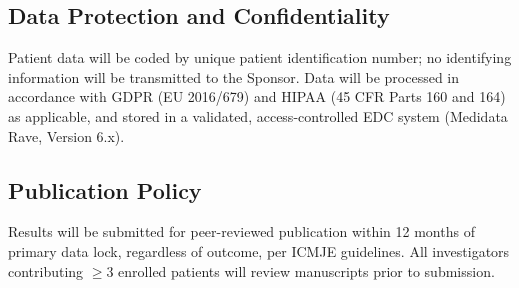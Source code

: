 \subsection{Data Protection and Confidentiality}

Patient data will be coded by unique patient identification number; no identifying information will be transmitted to the Sponsor. Data will be processed in accordance with GDPR (EU 2016/679) and HIPAA (45 CFR Parts 160 and 164) as applicable, and stored in a validated, access-controlled EDC system (Medidata Rave, Version 6.x).

\subsection{Publication Policy}

Results will be submitted for peer-reviewed publication within 12 months of primary data lock, regardless of outcome, per ICMJE guidelines. All investigators contributing $\geq$3 enrolled patients will review manuscripts prior to submission.

